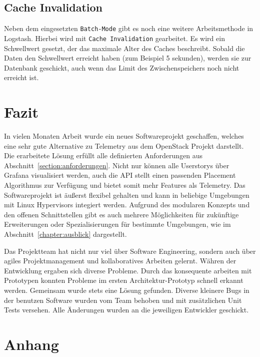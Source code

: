 \section{Cache Invalidation}
Neben dem eingesetzten \texttt{Batch-Mode} gibt es noch eine weitere
Arbeitsmethode in Logstash. Hierbei wird mit \texttt{Cache Invalidation}
gearbeitet. Es wird ein Schwellwert gesetzt, der das maximale Alter des Caches
beschreibt. Sobald die Daten den Schwellwert erreicht haben (zum Beispiel 5
sekunden), werden sie zur Datenbank geschickt, auch wenn das Limit des
Zwischenspeichers noch nicht erreicht ist.
\tm%

\chapter{Fazit}
In vielen Monaten Arbeit wurde ein neues Softwareprojekt geschaffen, welches
eine sehr gute Alternative zu Telemetry aus dem OpenStack Projekt darstellt.
Die erarbeitete Lösung erfüllt alle definierten Anforderungen aus
Abschnitt~\ref{section:anforderungen}. Nicht nur können alle Userstorys über
Grafana visualisiert werden, auch die API stellt einen passenden Placement
Algorithmus zur Verfügung und bietet somit mehr Features als Telemetry. Das
Softwareprojekt ist äußerst flexibel gehalten und kann in beliebige Umgebungen
mit Linux Hypervisors integiert werden. Aufgrund des modularen Konzepts und
den offenen Schnittstellen gibt es auch mehrere Möglichkeiten für zukünftige
Erweiterungen oder Spezialisierungen für bestimmte Umgebungen, wie im
Abschnitt~\ref{chapter:ausblick} dargestellt.

Das Projektteam hat nicht nur viel über Software Engineering, sondern auch
über agiles Projektmanagement und kollaboratives Arbeiten gelernt. Währen der
Entwicklung ergaben sich diverse Probleme. Durch das konsequente arbeiten mit
Prototypen konnten Probleme im ersten Architektur-Prototyp schnell erkannt
werden. Gemeinsam wurde stets eine Lösung gefunden. Diverse kleinere Bugs
in der benutzen Software wurden vom Team behoben und mit zusätzlichen Unit
Tests versehen. Alle Änderungen wurden an die jeweiligen Entwickler geschickt.
\all%


\printglossaries%

\printbibliography[heading=bibnumbered]

\chapter{Anhang}

